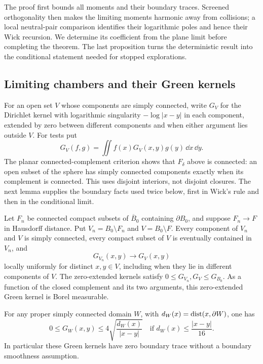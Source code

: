 The proof first bounds all moments and their boundary traces. Screened
orthogonality then makes the limiting moments harmonic away from collisions;
a local neutral-pair comparison identifies their logarithmic poles and hence
their Wick recursion. We determine its coefficient from the plane limit
before completing the theorem. The last proposition turns the deterministic
result into the conditional statement needed for stopped explorations.

\subsection{Limiting chambers and their Green kernels}

For an open set \(V\) whose components are simply connected, write \(G_V\)
for the Dirichlet kernel with logarithmic singularity \(-\log|x-y|\) in
each component, extended by zero between different components and when
either argument lies outside \(V\). For tests put
\[
 G_V(f,g)=\iint f(x)G_V(x,y)g(y)\,\dd x\,\dd y.
\]
The planar connected-complement criterion shows that \(F_\delta\) above is
connected: an open subset of the sphere has simply connected components
exactly when its complement is connected. This uses disjoint interiors, not
disjoint closures. The next lemma supplies the boundary facts used twice
below, first in Wick's rule and then in the conditional limit.

\begin{lemma}
\label{lem:flat-green-geometry}
Let \(F_n\) be connected compact subsets of \(\overline B_0\) containing
\(\partial B_0\), and suppose \(F_n\to F\) in Hausdorff distance. Put
\(V_n=B_0\setminus F_n\) and \(V=B_0\setminus F\). Every component of
\(V_n\) and \(V\) is simply connected, every compact subset of \(V\) is
eventually contained in \(V_n\), and
\[
                G_{V_n}(x,y)\longrightarrow G_V(x,y)
\]
locally uniformly for distinct \(x,y\in V\), including when they lie in
different components of \(V\).
The zero-extended kernels satisfy \(0\le G_{V_n},G_V\le G_{B_0}\).
As a function of the closed complement and its two arguments, this
zero-extended Green kernel is Borel measurable.

For any proper simply connected domain \(W\), with
\(d_W(x)=\operatorname{dist}(x,\partial W)\), one has
\begin{equation}
 0\le G_W(x,y)\le
       4\sqrt{\frac{d_W(x)}{|x-y|}}
 \quad\text{if }d_W(x)\le\frac{|x-y|}{16}.
 \label{eq:flat-green-boundary}
\end{equation}
In particular these Green kernels have zero boundary trace without a
boundary smoothness assumption.
\end{lemma}

